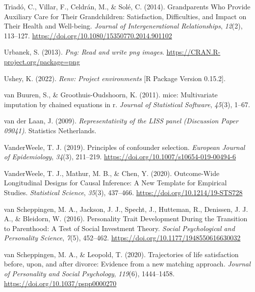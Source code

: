 \documentclass[
  english,
  man,floatsintext]{apa7}
\begin{document}
\leavevmode\hypertarget{ref-triadoGrandparentsWhoProvide2014}{}%
Triadó, C., Villar, F., Celdrán, M., \& Solé, C. (2014). Grandparents Who Provide Auxiliary Care for Their Grandchildren: Satisfaction, Difficulties, and Impact on Their Health and Well-being. \emph{Journal of Intergenerational Relationships}, \emph{12}(2), 113--127. \url{https://doi.org/10.1080/15350770.2014.901102}

\leavevmode\hypertarget{ref-R-png}{}%
Urbanek, S. (2013). \emph{Png: Read and write png images}. \url{https://CRAN.R-project.org/package=png}

\leavevmode\hypertarget{ref-R-renv}{}%
Ushey, K. (2022). \emph{Renv: Project environments} {[}R Package Version 0.15.2{]}.

\leavevmode\hypertarget{ref-mice2011}{}%
van Buuren, S., \& Groothuis-Oudshoorn, K. (2011). mice: Multivariate imputation by chained equations in r. \emph{Journal of Statistical Software}, \emph{45}(3), 1--67.

\leavevmode\hypertarget{ref-vanderlaanRepresentativityLISSPanel2009}{}%
van der Laan, J. (2009). \emph{Representativity of the LISS panel (Discussion Paper 09041)}. Statistics Netherlands.

\leavevmode\hypertarget{ref-vanderweelePrinciplesConfounderSelection2019}{}%
VanderWeele, T. J. (2019). Principles of confounder selection. \emph{European Journal of Epidemiology}, \emph{34}(3), 211--219. \url{https://doi.org/10.1007/s10654-019-00494-6}

\leavevmode\hypertarget{ref-vanderweeleOutcomeWideLongitudinalDesigns2020}{}%
VanderWeele, T. J., Mathur, M. B., \& Chen, Y. (2020). Outcome-Wide Longitudinal Designs for Causal Inference: A New Template for Empirical Studies. \emph{Statistical Science}, \emph{35}(3), 437--466. \url{https://doi.org/10.1214/19-STS728}

\leavevmode\hypertarget{ref-vanscheppingenPersonalityTraitDevelopment2016}{}%
van Scheppingen, M. A., Jackson, J. J., Specht, J., Hutteman, R., Denissen, J. J. A., \& Bleidorn, W. (2016). Personality Trait Development During the Transition to Parenthood: A Test of Social Investment Theory. \emph{Social Psychological and Personality Science}, \emph{7}(5), 452--462. \url{https://doi.org/10.1177/1948550616630032}

\leavevmode\hypertarget{ref-vanscheppingenTrajectoriesLifeSatisfaction2020}{}%
van Scheppingen, M. A., \& Leopold, T. (2020). Trajectories of life satisfaction before, upon, and after divorce: Evidence from a new matching approach. \emph{Journal of Personality and Social Psychology}, \emph{119}(6), 1444--1458. \url{https://doi.org/10.1037/pspp0000270}
\end{document}
